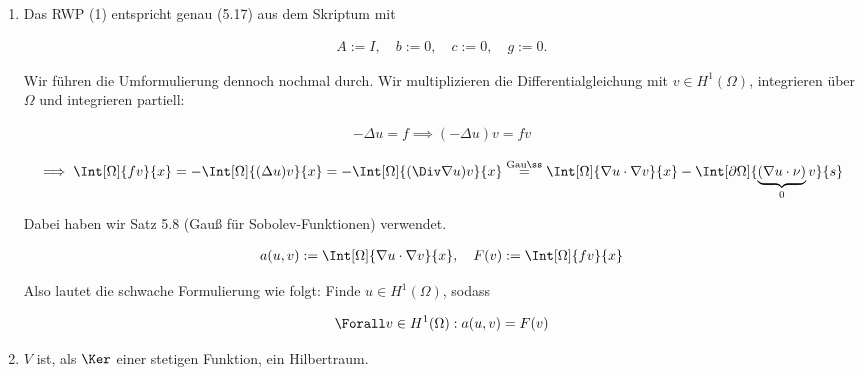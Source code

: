 \begin{solution}

\phantom{}

\begin{enumerate}[label = \alph*)]

    \item Das RWP (1) entspricht genau (5.17) aus dem Skriptum mit

    \begin{align*}
        A := I, \quad b := 0, \quad c := 0, \quad g := 0.
    \end{align*}

    Wir führen die Umformulierung dennoch nochmal durch.
    Wir multiplizieren die Differentialgleichung mit $v \in H^1(\Omega)$, integrieren über $\Omega$ und integrieren partiell:

    \begin{align*}
        -\Delta u = f
        \implies
        (-\Delta u) v = f v
    \end{align*}

    \begin{align*}
        \implies
        \Int[\Omega]{f v}{x}
        =
        -\Int[\Omega]{(\Delta u) v}{x}
        =
        -\Int[\Omega]{(\Div \nabla u) v}{x}
        \stackrel
        {
            \mathrm{Gauß}
        }{=}
        \Int[\Omega]{\nabla u \cdot \nabla v}{x}
        -
        \Int[\partial \Omega]{\underbrace{(\nabla u \cdot \nu)}_0 v}{s}
    \end{align*}

    Dabei haben wir Satz 5.8 (Gauß für Sobolev-Funktionen) verwendet.


    \begin{align*}
        a(u, v) := \Int[\Omega]{\nabla u \cdot \nabla v}{x},
        \quad
        F(v) := \Int[\Omega]{f v}{x}
    \end{align*}

    Also lautet die schwache Formulierung wie folgt:
    Finde $u \in H^1(\Omega)$, sodass

    \begin{align*}
        \Forall v \in H^1(\Omega):
        a(u, v) = F(v)
    \end{align*}

    \item $V$ ist, als $\Ker$ einer stetigen Funktion, ein Hilbertraum.


\end{enumerate}
\end{solution}

